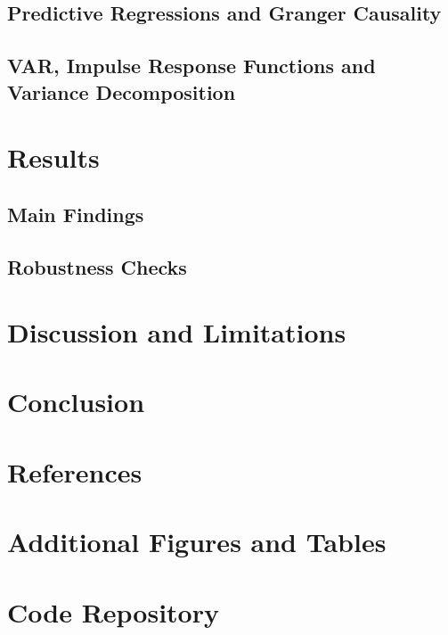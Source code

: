 \documentclass[11pt,a4paper]{article}
\begin{document}
\subsection{Predictive Regressions and Granger Causality}

\subsection{VAR, Impulse Response Functions and Variance Decomposition}


\section{Results}
\label{sec:results}

\subsection{Main Findings}

\subsection{Robustness Checks}


\section{Discussion and Limitations}
\label{sec:discussion}


\section{Conclusion}
\label{sec:conclusion}


\newpage
\section*{References}

\printbibliography[heading=none]


\newpage
\appendix

\section{Additional Figures and Tables}
\label{app:figures}


\section{Code Repository}
\label{app:code}
\end{document}
